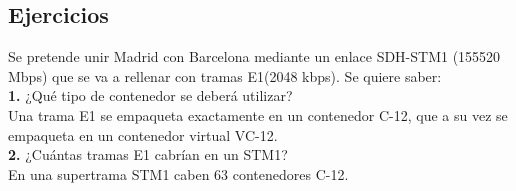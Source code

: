 \subsection{Ejercicios}
\begin{exercise}[1]
Se pretende unir Madrid con Barcelona mediante un enlace SDH-STM1 (155520 Mbps) que se va a rellenar con tramas E1(2048 kbps). Se quiere saber:\\
\textbf{1.} ¿Qué tipo de contenedor se deberá utilizar?\\
Una trama E1 se empaqueta exactamente en un contenedor C-12, que a su vez se empaqueta en un contenedor virtual VC-12.\\
\textbf{2.} ¿Cuántas tramas E1 cabrían en un STM1?\\
En una supertrama STM1 caben 63 contenedores C-12.
\end{exercise}